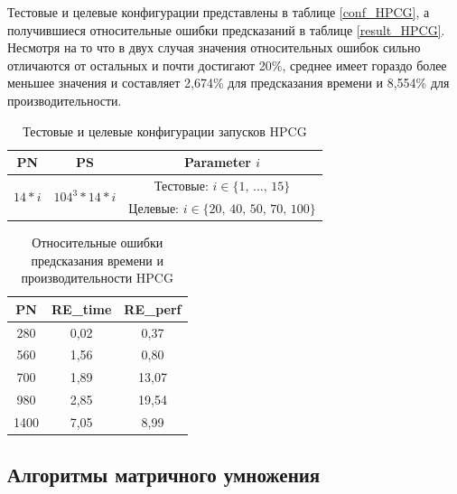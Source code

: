 	Тестовые и целевые конфигурации представлены в таблице \eqref{conf_HPCG}, а получившиеся относительные ошибки предсказаний в таблице \eqref{result_HPCG}. Несмотря на то что в двух случая значения относительных ошибок сильно отличаются от остальных и почти достигают 20\%, среднее имеет гораздо более меньшее значения и составляет 2,674\% для предсказания времени и 8,554\% для производительности.
	\begin{table}[b]
		\centering
		\begin{tabular}{|c|c|c|}
			\hline
			PN                          & PS                                 & Parameter \(i\)                                 \\ \hline
			\multirow{2}{*}{\(14 * i\)} & \multirow{2}{*}{\(104^3 * 14 *i\)} & Тестовые: \(i \in \{1,\,\ldots,\,15\}\)         \\ \cline{3-3}
			                            &                                    & Целевые:  \(i \in \{20,\,40,\,50,\,70,\,100\}\) \\ \hline
		\end{tabular}
		\caption{Тестовые и целевые конфигурации запусков HPCG}
		\label{conf_HPCG}
	\end{table}
	\begin{table}
		\centering
		\begin{tabular}{|c|c|c|}
			\hline
			PN   & RE\_time & RE\_perf \\ \hline
			280	 & 0,02     & 0,37     \\ \hline
			560	 & 1,56     & 0,80     \\ \hline
			700	 & 1,89     & 13,07    \\ \hline
			980	 & 2,85     & 19,54    \\ \hline
			1400 & 7,05     & 8,99     \\ \hline
		\end{tabular}
		\caption{Относительные ошибки предсказания времени и производительности HPCG}
		\label{result_HPCG}
	\end{table}

	\subsection{Алгоритмы матричного умножения}
